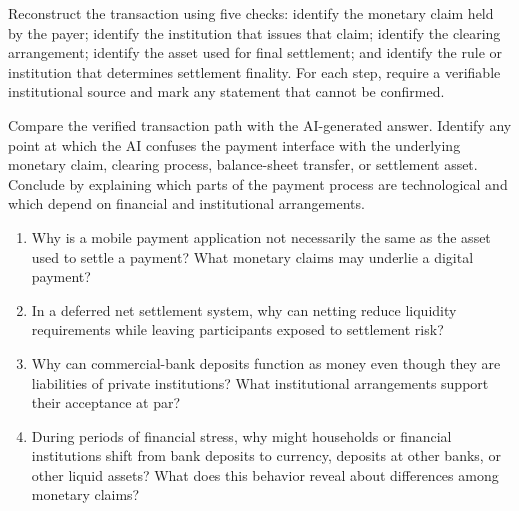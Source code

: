 Reconstruct the transaction using five checks: identify the monetary claim held by the payer; identify the institution that issues that claim; identify the clearing arrangement; identify the asset used for final settlement; and identify the rule or institution that determines settlement finality. For each step, require a verifiable institutional source and mark any statement that cannot be confirmed.

Compare the verified transaction path with the AI-generated answer. Identify any point at which the AI confuses the payment interface with the underlying monetary claim, clearing process, balance-sheet transfer, or settlement asset. Conclude by explaining which parts of the payment process are technological and which depend on financial and institutional arrangements.



\begin{enumerate}

\item Why is a mobile payment application not necessarily the same as the asset used to settle a payment? What monetary claims may underlie a digital payment?

\item In a deferred net settlement system, why can netting reduce liquidity requirements while leaving participants exposed to settlement risk?

\item Why can commercial-bank deposits function as money even though they are liabilities of private institutions? What institutional arrangements support their acceptance at par?

\item During periods of financial stress, why might households or financial institutions shift from bank deposits to currency, deposits at other banks, or other liquid assets? What does this behavior reveal about differences among monetary claims?

\end{enumerate}



